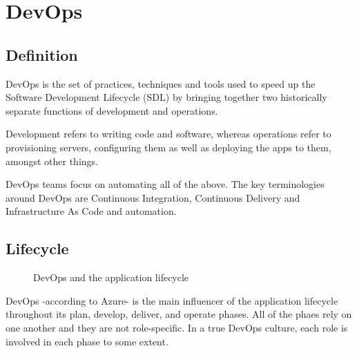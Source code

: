 \section{DevOps}

\subsection{Definition}
DevOps is the set of practices, techniques and tools used to speed up the Software Development Lifecycle (SDL) by bringing together two historically separate functions of development and operations.

\medskip
Development refers to writing code and software, whereas operations refer to provisioning servers, configuring them as well as deploying the apps to them, amongst other things.

\medskip
DevOps teams focus on automating all of the above.
The key terminologies around DevOps are Continuous Integration, Continuous Delivery and Infrastructure As Code and automation.

\subsection{Lifecycle}
\begin{figure}[H]
    \centering
    \caption{DevOps and the application lifecycle}
    \label{fig:devops-lifecycle}
\end{figure}

DevOps -according to Azure- is the main influencer of the application lifecycle throughout its plan, develop, deliver, and operate phases. All of the phaes rely on one another and they are not role-specific. In a true DevOps culture, each role is involved in each phase to some extent. \cite{devops}

